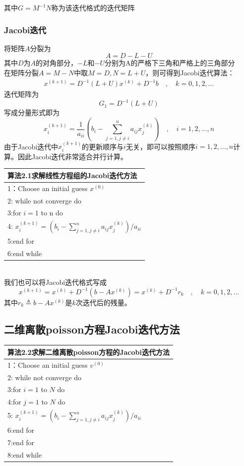 \documentclass[12pt,a4paper]{article}
\begin{document}
其中$G=M^{-1} N$称为该迭代格式的{\color{blue}迭代矩阵}
\subsubsection{Jacobi迭代}
将矩阵$A$分裂为$$A=D-L-U$$
其中$D$为$A$的对角部分，$-L$和$-U$分别为A的严格下三角和严格上的三角部分\\
在矩阵分裂$A=M-N$中取$M=D, N=L+U$，则可得到{\color{blue}Jacobi迭代}算法：
\begin{align}
x^{(k+1)}=D^{-1}(L+U) x^{(k)}+D^{-1} b \quad, \quad k=0,1,2, \ldots
\tag{6.8}
\end{align}
迭代矩阵为
$$
G_{1}=D^{-1}(L+U)
$$
写成分量形式即为
$$
x_{i}^{(k+1)}=\frac{1}{a_{i i}}\left(b_{i}-\sum_{j=1, j \neq i}^{n} a_{i j} x_{j}^{(k)}\right) \quad, \quad i=1,2, \ldots, n
$$
由于Jacobi迭代中$x_i^{(k+1)}$的更新顺序与$i$无关，即可以按照顺序$i=1,2,...,n$计算。因此Jacobi迭代非常适合并行计算。\\
\begin{tabular}{l}
\hline
{\color{blue}算法2.1}求解线性方程组的Jacobi迭代方法\\
\hline
1：Choose an initial guess $x^{(0)}$\\
2: while not converge do\\
3:\qquad for $i=1$ to n do\\
4:\qquad \qquad
$
x_{i}^{(k+1)}=\left(b_{i}-\sum_{j=1, j \neq i}^{n} a_{i j} x_{j}^{(k)}\right) / a_{i i}
$\\
5:\qquad end for\\
6:end while\\
\hline
\end{tabular}\\
我们也可以将Jacobi迭代格式写成\\
$$
x^{(k+1)}=x^{(k)}+D^{-1}\left(b-A x^{(k)}\right)=x^{(k)}+D^{-1} r_{k} \quad, \quad k=0,1,2, \ldots
$$
其中$r_{k} \triangleq b-A x^{(k)}$是$k$次迭代后的残量。\\
\subsection*{二维离散poisson方程Jacobi迭代方法}
\begin{tabular}{l}
\hline
{\color{blue}算法2.2}求解二维离散poisson方程的Jacobi迭代方法\\
\hline
1：Choose an initial guess $v^{(0)}$\\
2: while not converge do\\
3:\qquad for $i=1$ to $N$ do\\
4:\qquad \qquad for $j=1$ to $N$ do\\
5:\qquad \qquad \qquad
$
x_{i}^{(k+1)}=\left(b_{i}-\sum_{j=1, j \neq i}^{n} a_{i j} x_{j}^{(k)}\right) / a_{i i}
$\\
6:\qquad \qquad end for\\
7:\qquad end for\\
8:end while\\
\hline
\end{tabular}
\end{document}
